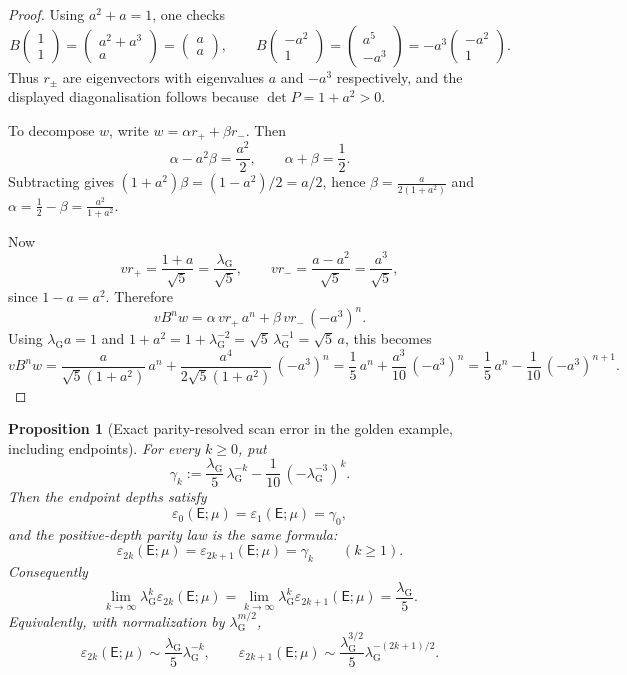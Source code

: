 \documentclass{etds}%
\numberwithin{equation}{section}
\theoremstyle{plain}
\newtheorem{proposition}[theorem]{Proposition}
\theoremstyle{definition}
\theoremstyle{remark}
\begin{document}
\begin{proof}
Using $a^2+a=1$, one checks
\[
B\begin{pmatrix}1\\ 1\end{pmatrix}
=\begin{pmatrix}a^2+a^3\\ a\end{pmatrix}
=\begin{pmatrix}a\\ a\end{pmatrix},
\qquad
B\begin{pmatrix}-a^2\\ 1\end{pmatrix}
=\begin{pmatrix}a^5\\ -a^3\end{pmatrix}
=-a^3\begin{pmatrix}-a^2\\ 1\end{pmatrix}.
\]
Thus $r_\pm$ are eigenvectors with eigenvalues $a$ and $-a^3$ respectively,
and the displayed diagonalisation follows because $\det P=1+a^2>0$.

To decompose $w$, write $w=\alpha r_+ + \beta r_-$.  Then
\[
\alpha-a^2\beta=\frac{a^2}{2},
\qquad
\alpha+\beta=\frac12.
\]
Subtracting gives $(1+a^2)\beta=(1-a^2)/2=a/2$, hence
$\beta=\frac{a}{2(1+a^2)}$ and
$\alpha=\frac12-\beta=\frac{a^2}{1+a^2}$.

Now
\[
vr_+=\frac{1+a}{\sqrt{5}}=\frac{\lambda_{\mathrm G}}{\sqrt{5}},
\qquad
vr_-=\frac{a-a^2}{\sqrt{5}}=\frac{a^3}{\sqrt{5}},
\]
since $1-a=a^2$.  Therefore
\[
vB^n w
=\alpha\,vr_+\,a^n+\beta\,vr_-\,(-a^3)^n.
\]
Using $\lambda_{\mathrm G} a=1$ and
$1+a^2=1+\lambda_{\mathrm G}^{-2}=\sqrt{5}\,\lambda_{\mathrm G}^{-1}=\sqrt{5}\,a$, this becomes
\[
vB^n w
=\frac{a}{\sqrt{5}(1+a^2)}\,a^n
+\frac{a^4}{2\sqrt{5}(1+a^2)}\,(-a^3)^n
=\frac15\,a^n+\frac{a^3}{10}\,(-a^3)^n
=\frac15\,a^n-\frac1{10}\,(-a^3)^{n+1}.
\]
\end{proof}

\begin{proposition}[Exact parity-resolved scan error in the golden example, including endpoints]
\label{prop:golden-parity-sharp}
For every $k\ge 0$, put
\[
\gamma_k
:=\frac{\lambda_{\mathrm G}}{5}\,\lambda_{\mathrm G}^{-k}
-\frac{1}{10}\,(-\lambda_{\mathrm G}^{-3})^k.
\]
Then the endpoint depths satisfy
\[
\varepsilon_0(\mathsf E;\mu)=\varepsilon_1(\mathsf E;\mu)=\gamma_0,
\]
and the positive-depth parity law is the same formula:
\[
\varepsilon_{2k}(\mathsf{E};\mu)
=\varepsilon_{2k+1}(\mathsf{E};\mu)
=\gamma_k
\qquad(k\ge1).
\]
Consequently
\[
\lim_{k\to\infty}\lambda_{\mathrm G}^k\varepsilon_{2k}(\mathsf{E};\mu)
=\lim_{k\to\infty}\lambda_{\mathrm G}^k\varepsilon_{2k+1}(\mathsf{E};\mu)
=\frac{\lambda_{\mathrm G}}{5}.
\]
Equivalently, with normalization by $\lambda_{\mathrm G}^{m/2}$,
\[
\varepsilon_{2k}(\mathsf{E};\mu)\sim \frac{\lambda_{\mathrm G}}{5}\lambda_{\mathrm G}^{-k},
\qquad
\varepsilon_{2k+1}(\mathsf{E};\mu)\sim
\frac{\lambda_{\mathrm G}^{3/2}}{5}\lambda_{\mathrm G}^{-(2k+1)/2}.
\]
\end{proposition}
\end{document}
